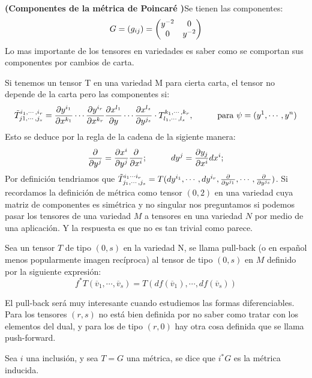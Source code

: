 \documentclass[palatino, bibnumbers]{apuntes}
\begin{document}
\begin{example}\textbf{(Componentes de la métrica de Poincaré )}\indent Se tienen las componentes:$$G=(g_{i\space j})=\begin{pmatrix}y^{-2}&0\\0&y^{-2}\\ \end{pmatrix}$$ Lo mas importante de los tensores en variedades es saber como se comportan sus componentes por cambios de carta.
\end{example}

Si tenemos un tensor T en una variedad M para cierta carta, el tensor no depende de la carta pero las componentes si: $$\tilde{T}^{i_1,\cdots,i_r}_{j1,\cdots,j_s}=\pdv{y^{i_1}}{x^{k_1}}\cdots\pdv{y^{i_r}}{x^{k_r}}\pdv{x^{l_1}}{y}\cdots\pdv{x^{l_s}}{y^{j_s}}\cdot T^{k_1,\cdots,k_r}_{l_1,\cdots,l_s},\hspace*{1cm}\text{para }\psi=(y^1,\cdots,y^n)$$
Esto se deduce por la regla de la cadena de la sigiente manera: $$\pdv{y^j}=\pdv{x^i}{y^j}\pdv{x^i};\hspace*{1cm} dy^j=\pdv{y_j}{x^i}dx^i;$$
Por definición tendriamos que $\tilde{T}^{i_1\cdots i_r}_{j_1,\cdots,j_s}=T(dy^{i_1},\cdots,dy^{i_r},\pdv{y^{j_1}},\cdots,\pdv{y^{j_s}})$.
Si recordamos la definición de métrica como tensor $(0,2)$ en una variedad cuya matriz de componentes es simétrica y no singular nos preguntamos si podemos pasar los tensores de una variedad $M$ a tensores en una variedad $N$ por medio de una aplicación. Y la respuesta es que no es tan trivial como parece. 

\begin{defn} Sea un tensor $T$ de tipo $(0,s)$ en la variedad N, se llama pull-back (o en español menos popularmente imagen recíproca) al tensor de tipo $(0,s)$ en $M$ definido por la siguiente expresión: $$f^*T(\overline{v}_1,\cdots,\overline{v}_s)=T(df(\overline{v}_1),\cdots,df(\overline{v}_s))$$
\end{defn}

El pull-back será muy interesante cuando estudiemos las formas diferenciables. Para los tensores $(r,s)$ no está bien definida por no saber como tratar con los elementos del dual, y para los de tipo $(r,0)$ hay otra cosa definida que se llama push-forward.
\newpage
\begin{defn} Sea $i$ una inclusión, y sea $T=G$ una métrica, se dice que $i^*G$ es la métrica inducida.
\end{defn}
\end{document}
